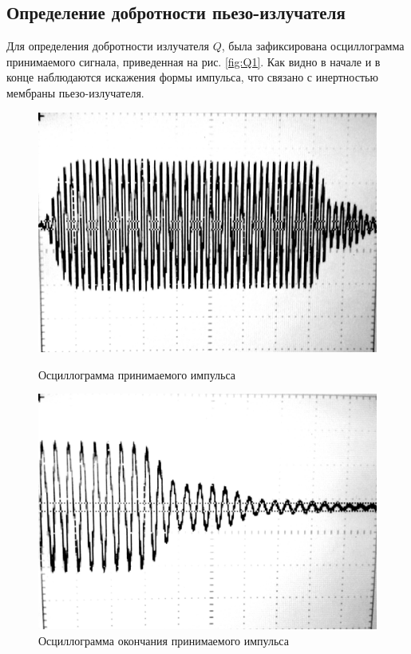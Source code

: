 \subsection{Определение добротности пьезо-излучателя}

Для определения добротности излучателя $Q$, была зафиксирована осциллограмма принимаемого сигнала, приведенная на рис.
\ref{fig:Q1}. Как видно в начале и в конце наблюдаются искажения формы импульса, что связано с инертностью мембраны
пьезо-излучателя. 

\begin{figure}[h!]
	\centering
	\begin{minipage}{0.49\linewidth}
		\includegraphics[width =\linewidth]{fig/Q/1.jpg}
		\caption{Осциллограмма принимаемого импульса}
		\label{fig:Q1}
	\end{minipage}
	\begin{minipage}{0.49\linewidth}
		\includegraphics[width =\linewidth]{fig/Q/3.jpg}
		\caption{Осциллограмма окончания принимаемого импульса}
		\label{fig:Q2}
	\end{minipage}
\end{figure}

